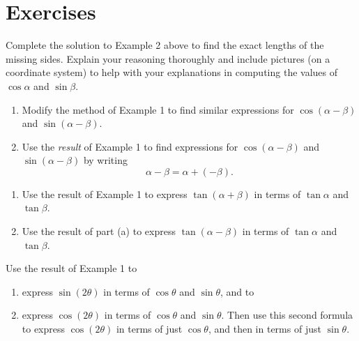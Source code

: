 \documentclass{ximera}
\begin{document}
\section{Exercises}

\begin{exercise}\label{Q0v93fA}
Complete the solution to Example 2 above to find the exact lengths of the missing sides. Explain your reasoning thoroughly and include pictures (on a coordinate system) to help with your explanations in computing the values of $\cos\alpha$ and $\sin\beta$.
\end{exercise}

\begin{exercise} \label{Evem81}
\begin{enumerate}
\item Modify the method of Example 1 to find similar expressions for $\cos(\alpha -\beta)$ and $\sin(\alpha - \beta)$.

\item Use the \emph{result} of Example 1 to find expressions for $\cos(\alpha -\beta)$ and $\sin(\alpha - \beta)$ by writing
\[
 \alpha - \beta = \alpha + (-\beta).
\]
\end{enumerate}
\end{exercise}

\begin{exercise} \label{Epve1mz}
\begin{enumerate}
\item Use the result of Example 1 to express $\tan(\alpha + \beta)$ in terms of $\tan\alpha$ and $\tan\beta$.

\item Use the result of part (a) to express $\tan(\alpha - \beta)$ in terms of $\tan\alpha$ and $\tan\beta$.
\end{enumerate}
\end{exercise}

\begin{exercise}\label{Ex7f3es}
Use the result of Example 1 to 

\begin{enumerate}
\item express $\sin (2\theta)$ in terms of $\cos\theta$ and $\sin\theta$, and to

\item express $\cos (2\theta)$ in terms of $\cos\theta$ and $\sin\theta$. Then use this second formula to express $\cos(2\theta)$ in terms of just $\cos\theta$, and then in terms of just $\sin\theta$.
\end{enumerate}

\end{exercise}
\end{document}
